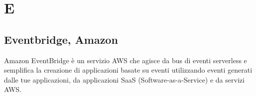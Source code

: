 \section{E}
\subsection{Eventbridge, Amazon}
Amazon EventBridge è un servizio AWS che agisce da bus di eventi serverless e semplifica la creazione di applicazioni basate su eventi utilizzando eventi generati dalle tue applicazioni, da applicazioni SaaS (Software-as-a-Service) e da servizi AWS.
\clearpage